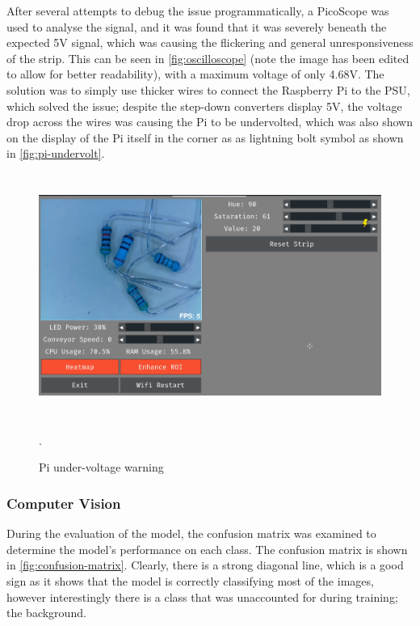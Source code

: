 After several attempts to debug the issue programmatically, a PicoScope \cite{picoscope} was used to analyse the signal, and it was found that it was severely beneath the expected 5V signal, which was causing the flickering and general unresponsiveness of the strip. This can be seen in \autoref{fig:oscilloscope} (note the image has been edited to allow for better readability), with a maximum voltage of only 4.68V. The solution was to simply use thicker wires to connect the Raspberry Pi to the PSU, which solved the issue; despite the step-down converters display 5V, the voltage drop across the wires was causing the Pi to be undervolted, which was also shown on the display of the Pi itself in the corner as as lightning bolt symbol as shown in \autoref{fig:pi-undervolt}.
\begin{figure}[H]
    \centering
    \includegraphics[height=8cm]{imgs/software/undervolt.jpg}
    \caption{Pi under-voltage warning}
    \label{fig:pi-undervolt}.
  \end{figure}

\subsubsection{Computer Vision}

During the evaluation of the model, the confusion matrix was examined to determine the model's performance on each class. The confusion matrix is shown in \autoref{fig:confusion-matrix}. Clearly, there is a strong diagonal line, which is a good sign as it shows that the model is correctly classifying most of the images, however interestingly there is a class that was unaccounted for during training; the background. 

